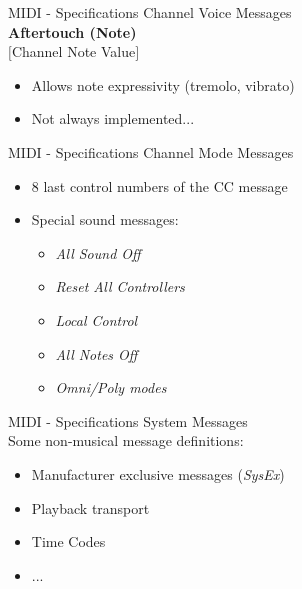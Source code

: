 \documentclass{beamer}
\begin{document}
\begin{frame}{MIDI - Specifications}
    Channel Voice Messages\\
    \vspace{5mm}
    \textbf{Aftertouch (Note)}\\
    $[$Channel Note Value$]$
    \vspace{5mm}
    \begin{itemize}
        \item Allows note expressivity (tremolo, vibrato)
        \item Not always implemented...
    \end{itemize}
\end{frame}

\begin{frame}{MIDI - Specifications}
    Channel Mode Messages\\
    \vspace{5mm}
    \begin{itemize}
        \item 8 last control numbers of the CC message
        \item Special sound messages:
        \begin{itemize}
            \item \textit{All Sound Off}
            \item \textit{Reset All Controllers}
            \item \textit{Local Control}
            \item \textit{All Notes Off}
            \item \textit{Omni/Poly modes}
        \end{itemize}
    \end{itemize}
\end{frame}

\begin{frame}{MIDI - Specifications}
    System Messages\\
    \vspace{5mm}
    Some non-musical message definitions:
    \begin{itemize}
        \item Manufacturer exclusive messages (\textit{SysEx})
        \item Playback transport
        \item Time Codes
        \item ...
    \end{itemize}
\end{frame}
\end{document}
